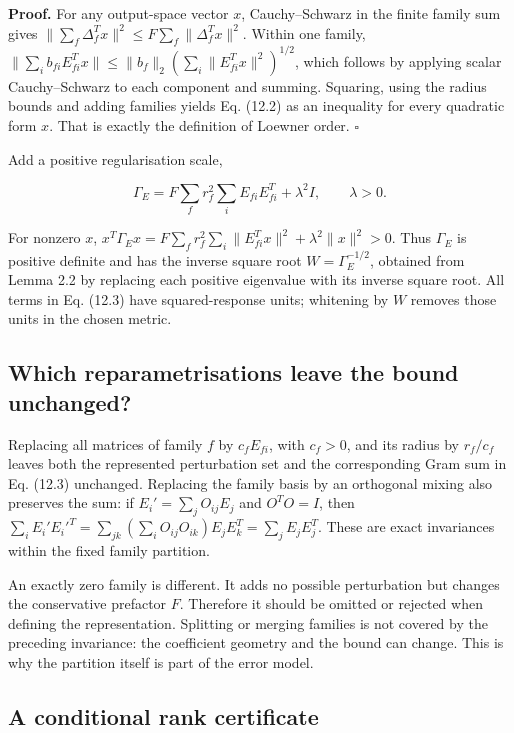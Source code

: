 \documentclass[
  11pt,
  a4paper]{article}
\begin{document}
\textbf{Proof.} For any output-space vector \(x\), Cauchy--Schwarz in the finite family sum gives
\(\|\sum_f\Delta_f^Tx\|^2\le F\sum_f\|\Delta_f^Tx\|^2\).
Within one family,
\(\|\sum_i b_{fi}E_{fi}^Tx\|\le\|b_f\|_2(\sum_i\|E_{fi}^Tx\|^2)^{1/2}\),
which follows by applying scalar Cauchy--Schwarz to each component and summing. Squaring, using the radius bounds and adding families yields Eq. (12.2) as an inequality for every quadratic form \(x\). That is exactly the definition of Loewner order. \(\square\)

Add a positive regularisation scale,

\[
\Gamma_E=F\sum_f r_f^2\sum_iE_{fi}E_{fi}^T+\lambda^2I,
\qquad\lambda>0.
\tag{12.3}
\]

For nonzero \(x\),
\(x^T\Gamma_Ex=F\sum_fr_f^2\sum_i\|E_{fi}^Tx\|^2+\lambda^2\|x\|^2>0\).
Thus \(\Gamma_E\) is positive definite and has the inverse square root \(W=\Gamma_E^{-1/2}\), obtained from Lemma 2.2 by replacing each positive eigenvalue with its inverse square root. All terms in Eq. (12.3) have squared-response units; whitening by \(W\) removes those units in the chosen metric.

\hypertarget{which-reparametrisations-leave-the-bound-unchanged}{%
\subsection{Which reparametrisations leave the bound unchanged?}\label{which-reparametrisations-leave-the-bound-unchanged}}

Replacing all matrices of family \(f\) by \(c_fE_{fi}\), with \(c_f>0\), and its radius by \(r_f/c_f\) leaves both the represented perturbation set and the corresponding Gram sum in Eq. (12.3) unchanged. Replacing the family basis by an orthogonal mixing also preserves the sum: if \(E_i'=\sum_jO_{ij}E_j\) and \(O^TO=I\), then
\(\sum_iE_i'E_i'^T=\sum_{jk}(\sum_iO_{ij}O_{ik})E_jE_k^T=\sum_jE_jE_j^T\).
These are exact invariances within the fixed family partition.

An exactly zero family is different. It adds no possible perturbation but changes the conservative prefactor \(F\). Therefore it should be omitted or rejected when defining the representation. Splitting or merging families is not covered by the preceding invariance: the coefficient geometry and the bound can change. This is why the partition itself is part of the error model.

\hypertarget{a-conditional-rank-certificate}{%
\subsection{A conditional rank certificate}\label{a-conditional-rank-certificate}}
\end{document}
